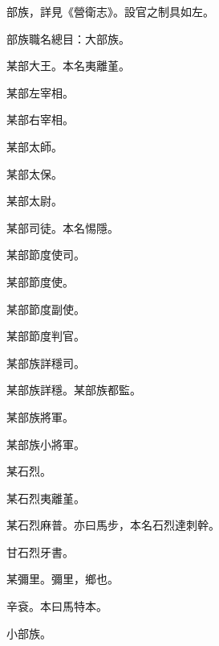 
\begin{pinyinscope}

 部族，詳見《營衛志》。設官之制具如左。



 部族職名總目：大部族。



 某部大王。本名夷離堇。



 某部左宰相。



 某部右宰相。



 某部太師。



 某部太保。



 某部太尉。



 某部司徒。本名惕隱。



 某部節度使司。



 某部節度使。



 某部節度副使。



 某部節度判官。



 某部族詳穩司。



 某部族詳穩。某部族都監。



 某部族將軍。



 某部族小將軍。



 某石烈。



 某石烈夷離堇。



 某石烈麻普。亦曰馬步，本名石烈達刺幹。



 甘石烈牙書。



 某彌里。彌里，鄉也。



 辛袞。本曰馬特本。



 小部族。




\end{pinyinscope}

